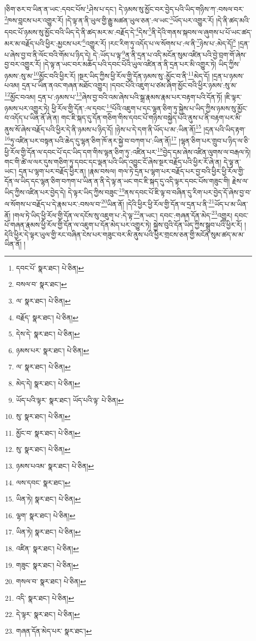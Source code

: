 །ཅིག་ཅར་བ་ཡིན་ན་ཡང་:དབང་པོས་\footnote{དབང་པོ་  སྣར་ཐང་།  པེ་ཅིན། }ཤེས་པ་དང་། དེ་ཉམས་སུ་མྱོང་བར་བྱེད་པའི་ཡིད་གཉིས་ཀ་:བསལ་བར་\footnote{བསལ་བ་  སྣར་ཐང་། }ཁས་བླངས་པར་འགྱུར་རོ། །དེ་ལྟ་ན་ནི་ཡུལ་གྱི་རྒྱུ་མཚན་ཡུལ་ཅན་:ལ་ཡང་\footnote{ལ་  སྣར་ཐང་།  པེ་ཅིན། }ཡོད་པར་འགྱུར་རོ། །དེ་ནི་ཚད་མའི་དབང་པོ་ཉམས་སུ་མྱོང་བའི་ཡིད་དེ་ནི་ཚད་མར་མ་:བརྗོད་དེ་\footnote{བརྗོད་  སྣར་ཐང་།  པེ་ཅིན། }དེས་\footnote{དེས་དེ་  སྣར་ཐང་།  པེ་ཅིན། }ནི་དེའི་གནས་སྐབས་ལ་ཞུགས་པ་པོ་ཡང་ཚད་མར་མ་བརྗོད་པའི་ཕྱིར་:མྱངས་པར་\footnote{ཉམས་པར་  སྣར་ཐང་།  པེ་ཅིན། }འགྱུར་རོ། །རང་རིག་ཏུ་འདོད་པ་ལ་སོགས་པ་:ལ་ནི་\footnote{ལ་  སྣར་ཐང་།  པེ་ཅིན། }ཉེས་པ་:མེད་དོ།\footnote{མེད་དེ།  སྣར་ཐང་།  པེ་ཅིན། } །དྲན་པ་ཞེས་བྱ་བ་ནི་ལོང་བའི་གོམ་པ་ཉིད་དེ། དེ་:ཡོད་པ་ལྟ་\footnote{ཡོད་པའི་ལྟར་  སྣར་ཐང་། ཡོད་པའི་ལྟ་  པེ་ཅིན། }ན་ནི་དྲན་པ་འདི་མངོན་སུམ་འཛིན་པའི་བྱེ་བྲག་གོ་ཞེས་བྱ་བར་འགྱུར་རོ། །དེ་ལྟ་ན་ཡང་བར་མཆོད་པའི་དབང་པོའི་ཡུལ་འཛིན་ན་ནི་དྲན་པར་མི་འགྱུར་ཏེ། ཡིད་ཀྱིས་ཉམས་:སུ་མ་\footnote{སུ་  སྣར་ཐང་།  པེ་ཅིན། }མྱོང་བའི་ཕྱིར་རོ། །སྔར་ཡིད་ཀྱིས་ཕྱི་རོལ་གྱི་དོན་ཉམས་སུ་:མྱོང་བ་ནི་\footnote{མྱོང་བ་  སྣར་ཐང་།  པེ་ཅིན། }མེད་དོ། །དྲན་པ་ཉམས་པའམ། དྲན་པ་ཡིན་ནའང་གཞན་མཐོང་འགྱུར། །དབང་པོའི་འཇུག་པ་ཙམ་ཞིག་མྱོང་བའི་ཕྱིར་ཉམས་:སུ་མ་\footnote{སུ་  སྣར་ཐང་།  པེ་ཅིན། }མྱོང་བའམ། དྲན་པ་:ཉམས་པ་\footnote{ཉམས་པའམ་  སྣར་ཐང་།  པེ་ཅིན། }ཞེས་བྱ་བའི་འམ་ཞེས་པའི་སྒྲ་རྣམས་རྣམ་པར་བརྟག་པའི་དོན་ཏོ། །ཇི་ལྟར་ཉམས་པར་འགྱུར་ཏེ། ཕྱི་རོལ་གྱི་དོན་:ལ་དབང་\footnote{ལས་དབང་  སྣར་ཐང་། }པོའི་འཇུག་པ་དང་ལྷན་ཅིག་ཏུ་སྐྱེས་པ་ཡིད་ཀྱིས་ཉམས་སུ་མྱོང་བ་འདོད་པ་ཡིན་ནོ་ཞེ་ན། གང་ཇི་སྐད་དུ་དོན་གཅིག་གིས་དབང་པོ་གཉིས་བསྐྱེད་པའི་ནུས་པ་ནི་བརྟག་པར་མི་ནུས་སོ་ཞེས་བརྗོད་པའི་ཕྱིར་དེ་ནི་ཉམས་པ་ཉིད་དོ། །ཉེས་པ་དེ་དག་ནི་ཡོད་པ་མ་:ཡིན་ནོ།\footnote{ཡིན་ཏེ།  སྣར་ཐང་།  པེ་ཅིན། } །དྲན་པའི་ཡིད་རྟག་\footnote{ལྷག་  སྣར་ཐང་།  པེ་ཅིན། }ཏུ་འཛིན་པར་བསྟན་པའི་ཆེད་དུ་ལྷན་ཅིག་ཁོ་ནར་སྐྱེ་བ་བཀག་པ་:ཡིན་ནོ།\footnote{ཡིན་ཏེ།  སྣར་ཐང་།  པེ་ཅིན། } །ལྷན་ཅིག་པར་གྲུབ་པ་ཉིད་ལ་ཅི་ཕྱི་རོལ་གྱི་དོན་ལ་དབང་པོ་དང་ཡིད་དག་གིས་ལྷན་ཅིག་ཏུ་:འཛིན་པར་\footnote{འཛིན་  སྣར་ཐང་།  པེ་ཅིན། }བྱེད་དམ་ཞེས་འཛིན་ལུགས་ལ་བརྒལ་ཏེ། གང་གི་ཚེ་ལ་ལར་དུས་གཅིག་ཏུ་དབང་དང་ལྡན་པའི་ཡིད་འབྱུང་ངོ་ཞེས་སྔར་བརྗོད་པའི་ཕྱིར་རོ་ཞེ་ན། དེ་ལྟ་ན་ཡང་། དྲན་པ་ལྷག་པར་བརྗོད་ཕྱིར་ན། །རྣམ་བསལ། གལ་ཏེ་དྲན་པ་ལྷག་པར་བརྗོད་པར་བྱ་བའི་ཕྱིར་ཕྱི་རོལ་གྱི་དོན་ལ་ཡིད་དང་ལྷན་ཅིག་བཀག་པ་ཡིན་ན་ནི་དེ་ལྟ་ན་ཡང་གང་ཇི་སྐད་དུ་འདི་ལྟར་དབང་པོས་གཟུང་གི། རྗེས་ལ་ཡིད་ཀྱིས་འཛིན་པར་བྱེད་དེ། དེ་ལྟར་ཡིད་ཀྱིས་བཟུང་\footnote{གཟུང་  སྣར་ཐང་།  པེ་ཅིན། }ནས་དབང་པོ་ཇི་ལྟ་བ་བཞིན་དུ་རིག་པར་བྱེད་དོ་ཞེས་བྱ་བ་ལ་སོགས་པ་བརྗོད་པ་དེ་རྣམ་པར་:བསལ་བ་\footnote{གསལ་བ་  སྣར་ཐང་།  པེ་ཅིན། }ཡིན་ནོ། །དེའི་ཕྱིར་ཕྱི་རོལ་གྱི་དོན་ལ་དྲན་པ་ནི་\footnote{འདི་  སྣར་ཐང་།  པེ་ཅིན། }ཡོད་པ་མ་ཡིན་ནོ། །གལ་ཏེ་ཡིད་ཕྱི་རོལ་གྱི་དོན་ལ་དངོས་སུ་འཇུག་པ་:དེ་ལྟ་\footnote{དེ་ལྟར་  སྣར་ཐང་།  པེ་ཅིན། }ན་ཡང་། དབང་:གཞན་དོན་མེད་\footnote{གཞན་དོན་མེད་པར་  སྣར་ཐང་། }འགྱུར། དབང་པོ་གཞན་རྣམས་ཕྱི་རོལ་གྱི་དོན་ལ་འཇུག་པ་དོན་མེད་པར་འགྱུར་ཏེ། སྐྱེས་བུའི་དོན་ཡིད་ཀྱིས་སྒྲུབ་པའི་ཕྱིར་རོ། །དེའི་ཕྱིར་དེ་ལྟར་ཡུལ་གྱི་རང་བཞིན་ངེས་པར་གཟུང་བར་མི་ནུས་པའི་ཕྱིར་གྲངས་ཅན་གྱི་མངོན་སུམ་ཚད་མ་མ་ཡིན་ནོ། །
